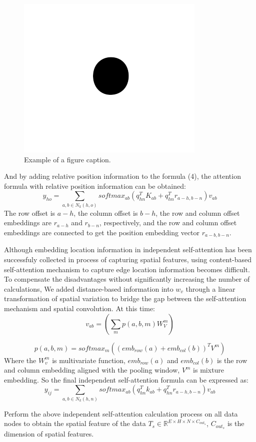 \documentclass[conference]{IEEEtran}
\begin{document}
\begin{figure}[htbp]
    \centerline{\includegraphics{fig1.png}}
    \caption{Example of a figure caption.}
    \label{fig}
\end{figure}
And by adding relative position information to the formula (4), the attention formula with relative position information can be obtained:
\begin{equation}
    y_{ho} = \sum_{a,b \in N_k(h,o)} softmax_{ab}(q_{hn}^TK_{ab} + q_{hn}^Tr_{a-h,b-n})v_{ab}
\end{equation}
The row offset is $a-h$, the column offset is $b-h$, the row and column offset embeddings are $r_{a-h}$ and $r_{b-n}$, respectively, and the row and column offset embeddings are connected to get the position embedding vector $r_{a-b ,b-n}$.
\par
Although embedding location information in independent self-attention has been successfuly collected in process of capturing spatial features, using content-based self-attention mechanism to capture edge location information becomes difficult. To compensate the disadvantages without significantly increasing the number of calculations, We added distance-based information into $w_v$ through a linear transformation of spatial variation to bridge the gap between the self-attention mechanism and spatial convolution. At this time:
\begin{equation}
    v_{ab} = (\sum_{m} p(a,b,m)W_V^m)  
\end{equation}

\begin{equation}
    p(a,b,m) = softmax_m((emb_{row}(a) + emb_{col}(b))^TV^m) 
\end{equation}
Where the $W_v^m$ is multivariate function, $emb_{row}(a)$ and $emb_{col}(b)$ is the row and column embedding aligned with the pooling window, $V^m$ is mixture embedding. So the final independent self-attention formula can be expressed as:
\begin{equation}
    y_{ij} = \sum_{a,b \in N_k(h,n)} softmax_{ab}(q_{hn}^Tk_{ab} + q_{hn}^Tr_{a-h,b-n})v_{ab}
\end{equation}
\par
Perform the above independent self-attention calculation process on all data nodes to obtain the spatial feature of the data $T_s \in \mathbb{R} ^{E \times H \times N \times C_{out_s}}$, $C_{out_s}$ is the dimension of spatial features.
\end{document}
